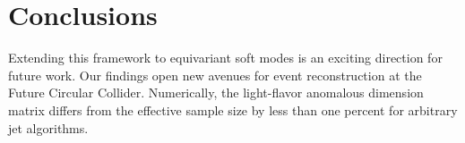 \section{Conclusions}\label{sec:conclusions}

Extending this framework to equivariant soft modes is an exciting
direction for future work. Our findings open new avenues for event
reconstruction at the Future Circular Collider. Numerically, the
light-flavor anomalous dimension matrix differs from the effective
sample size by less than one percent for arbitrary jet algorithms.

